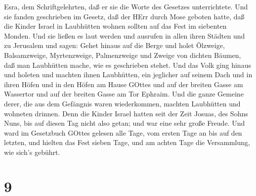 Esra, dem Schriftgelehrten, daß er sie die Worte des Gesetzes
unterrichtete.  Und sie fanden geschrieben im Gesetz, daß
der HErr durch Mose geboten hatte, daß die Kinder Israel in Laubhütten
wohnen sollten auf das Fest im siebenten Monden.  Und sie
ließen es laut werden und ausrufen in allen ihren Städten und zu
Jerusalem und sagen: Gehet hinaus auf die Berge und holet Ölzweige,
Balsamzweige, Myrtenzweige, Palmenzweige und Zweige von dichten Bäumen,
daß man Laubhütten mache, wie es geschrieben stehet.  Und
das Volk ging hinaus und holeten und machten ihnen Laubhütten, ein
jeglicher auf seinem Dach und in ihren Höfen und in den Höfen am Hause
GOttes und auf der breiten Gasse am Wassertor und auf der breiten Gasse
am Tor Ephraim.  Und die ganze Gemeine derer, die aus dem
Gefängnis waren wiederkommen, machten Laubhütten und wohneten drinnen.
Denn die Kinder Israel hatten seit der Zeit Josuas, des Sohns Nuns, bis
auf diesen Tag nicht also getan; und war eine sehr große Freude.
 Und ward im Gesetzbuch GOttes gelesen alle Tage, vom
ersten Tage an bis auf den letzten, und hielten das Fest sieben Tage,
und am achten Tage die Versammlung, wie sich's gebührt.

\hypertarget{section-8}{%
\section{9}\label{section-8}}

